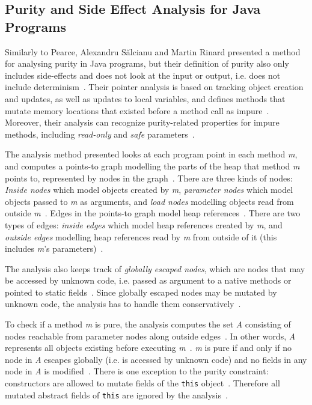 \documentclass[a4paper,12pt]{article}
\begin{document}

\subsection{Purity and Side Effect Analysis for Java Programs} \label{sub:Purity and Side Effect Analysis for Java Programs}
Similarly to Pearce, Alexandru S\u{a}lcianu and Martin Rinard presented a method for analysing purity in Java programs, but their definition of purity also only includes side-effects and does not look at the input or output, i.e. does not include determinism~\cite{salcianu}. Their pointer analysis is based on tracking object creation and updates, as well as updates to local variables, and defines methods that mutate memory locations that existed before a method call as impure~\cite{salcianu}. Moreover, their analysis can recognize purity-related properties for impure methods, including \textit{read-only} and \textit{safe} parameters~\cite{salcianu}.

The analysis method presented looks at each program point in each method \textit{m}, and computes a points-to graph modelling the parts of the heap that method \textit{m} points to, represented by nodes in the graph~\cite{salcianu}. There are three kinds of nodes: \textit{Inside nodes} which model objects created by \textit{m}, \textit{parameter nodes} which model objects passed to \textit{m} as arguments, and \textit{load nodes} modelling objects read from outside \textit{m}~\cite{salcianu}. Edges in the points-to graph model heap references~\cite{salcianu}. There are two types of edges: \textit{inside edges} which model heap references created by \textit{m}, and \textit{outside edges} modelling heap references read by \textit{m} from outside of it (this includes \textit{m}'s parameters)~\cite{salcianu}.


The analysis also keeps track of \textit{globally escaped nodes}, which are nodes that may be accessed by unknown code, i.e. passed as argument to a native methods or pointed to static fields~\cite{salcianu}. Since globally escaped nodes may be mutated by unknown code, the analysis has to handle them conservatively~\cite{salcianu}.

To check if a method \textit{m} is pure, the analysis computes the set \textit{A} consisting of nodes reachable from parameter nodes along outside edges~\cite{salcianu}. In other words, \textit{A} represents all objects existing before executing \textit{m}~\cite{salcianu}. \textit{m} is pure if and only if no node in \textit{A} escapes globally (i.e. is accessed by unknown code) and no fields in any node in \textit{A} is modified~\cite{salcianu}. There is one exception to the purity constraint: constructors are allowed to mutate fields of the \texttt{this} object~\cite{salcianu}. Therefore all mutated abstract fields of \texttt{this} are ignored by the analysis~\cite{salcianu}.
\end{document}
